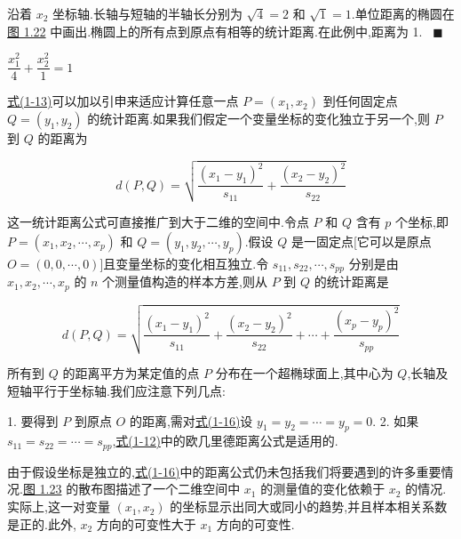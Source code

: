 
沿着 $x_2$ 坐标轴.长轴与短轴的半轴长分别为 $\sqrt{4} = 2$ 和 $\sqrt{1} = 1$.单位距离的椭圆在\hyperref[fig:1.22]{图 1.22} 中画出.椭圆上的所有点到原点有相等的统计距离.在此例中,距离为 1. \ $\blacksquare$

\begin{mvfigure}
\label{fig:1.22}
\vspace{2pt}
$\dfrac{x_1^2}{4} + \dfrac{x_2^2}{1} = 1$
\end{mvfigure}

\hyperref[eq:1-13]{式(1-13)}可以加以引申来适应计算任意一点 $P = (x_1,x_2)$ 到任何固定点 $Q = (y_1,y_2)$ 的统计距离.如果我们假定一个变量坐标的变化独立于另一个,则 $P$ 到 $Q$ 的距离为

\label{eq:1-15}
\begin{equation}
d(P,Q) = \sqrt{\frac{(x_1 - y_1)^2}{s_{11}} + \frac{(x_2 - y_2)^2}{s_{22}}} \tag{1-15}
\end{equation}

这一统计距离公式可直接推广到大于二维的空间中.令点 $P$ 和 $Q$ 含有 $p$ 个坐标,即 $P = (x_1,x_2,\cdots,x_p)$ 和 $Q = (y_1,y_2,\cdots,y_p)$.假设 $Q$ 是一固定点[它可以是原点 $O = (0,0,\cdots,0)$]且变量坐标的变化相互独立.令 $s_{11},s_{22},\cdots,s_{pp}$ 分别是由 $x_1,x_2,\cdots,x_p$ 的 $n$ 个测量值构造的样本方差,则从 $P$ 到 $Q$ 的统计距离是

\label{eq:1-16}
\begin{equation}
d(P,Q) = \sqrt{\frac{(x_1 - y_1)^2}{s_{11}} + \frac{(x_2 - y_2)^2}{s_{22}} + \cdots + \frac{(x_p - y_p)^2}{s_{pp}}} \tag{1-16}
\end{equation}

所有到 $Q$ 的距离平方为某定值的点 $P$ 分布在一个超椭球面上,其中心为 $Q$,长轴及短轴平行于坐标轴.我们应注意下列几点:

1. 要得到 $P$ 到原点 $O$ 的距离,需对\hyperref[eq:1-16]{式(1-16)}设 $y_1 = y_2 = \cdots = y_p = 0$.
2. 如果 $s_{11} = s_{22} = \cdots = s_{pp}$,\hyperref[eq:1-12]{式(1-12)}中的欧几里德距离公式是适用的.

\begin{mvfigure}
\label{fig:1.23}
\end{mvfigure}

由于假设坐标是独立的,\hyperref[eq:1-16]{式(1-16)}中的距离公式仍未包括我们将要遇到的许多重要情况.\hyperref[fig:1.23]{图 1.23} 的散布图描述了一个二维空间中 $x_1$ 的测量值的变化依赖于 $x_2$ 的情况.实际上,这一对变量 $(x_1,x_2)$ 的坐标显示出同大或同小的趋势,并且样本相关系数是正的.此外, $x_2$ 方向的可变性大于 $x_1$ 方向的可变性.

